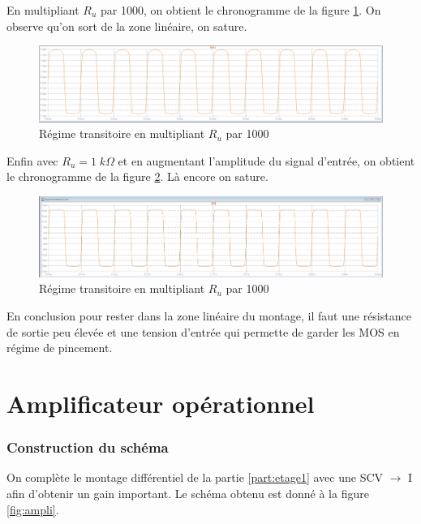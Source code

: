 \documentclass[french]{article}
\begin{document}
En multipliant $R_u$ par 1000, on obtient le chronogramme de la figure \ref{transitoire2}. On observe qu'on sort de la zone linéaire, on sature.

\begin{figure}[h!]
	\includegraphics[width=\textwidth]{images/MulRuPar1000.PNG}
	\caption{Régime transitoire en multipliant $R_u$ par 1000}
	\label{transitoire2}
\end{figure}

Enfin avec $R_u = 1 \; k \Omega$ et en augmentant l'amplitude du signal d'entrée, on obtient le chronogramme de la figure \ref{transitoire3}. Là encore on sature.

\begin{figure}[h!]
	\includegraphics[width=\textwidth]{images/AugmentationSignalPar10.PNG}
	\caption{Régime transitoire en multipliant $R_u$ par 1000}
	\label{transitoire3}
\end{figure}

En conclusion pour rester dans la zone linéaire du montage, il faut une résistance de sortie peu élevée et une tension d'entrée qui permette de garder les MOS en régime de pincement.

\newpage
\part{Amplificateur opérationnel}

\section{Construction du schéma}

On complète le montage différentiel de la partie \ref{part:etage1} avec une SCV $\rightarrow$ I afin d'obtenir un gain important. Le schéma obtenu est donné à la figure \ref{fig:ampli}.
\end{document}
